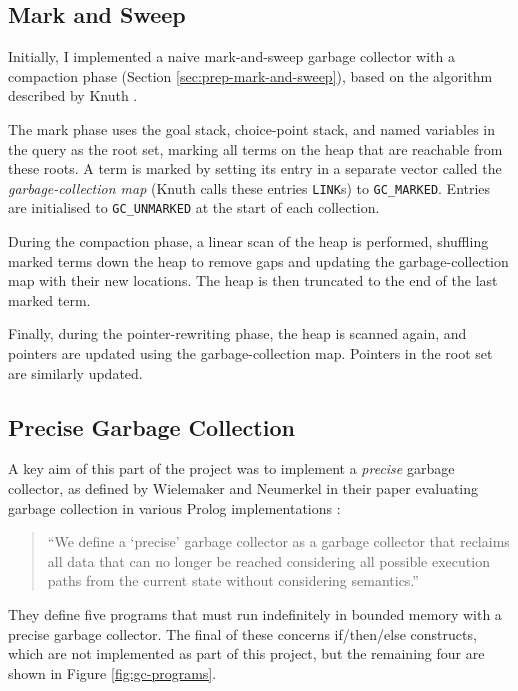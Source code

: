 \subsection{Mark and Sweep}

\label{sec:mark-and-sweep}

Initially, I implemented a naive mark-and-sweep garbage collector with a compaction phase (Section \ref{sec:prep-mark-and-sweep}), based on the algorithm described by Knuth \cite{knuthArtComputerProgramming1997}.

The mark phase uses the goal stack, choice-point stack, and named variables in the query as the root set, marking all terms on the heap that are reachable from these roots. A term is marked by setting its entry in a separate vector called the \emph{garbage-collection map} (Knuth calls these entries \texttt{LINK}s) to \texttt{GC\_MARKED}. Entries are initialised to \texttt{GC\_UNMARKED} at the start of each collection.

During the compaction phase, a linear scan of the heap is performed, shuffling marked terms down the heap to remove gaps and updating the garbage-collection map with their new locations. The heap is then truncated to the end of the last marked term.

Finally, during the pointer-rewriting phase, the heap is scanned again, and pointers are updated using the garbage-collection map. Pointers in the root set are similarly updated.

\subsection{Precise Garbage Collection}

\label{sec:precise-gc}

A key aim of this part of the project was to implement a \emph{precise} garbage collector, as defined by Wielemaker and Neumerkel in their paper evaluating garbage collection in various Prolog implementations \cite{wielemakerPreciseGarbageCollection2008}:

\begin{quote}
``We define a `precise' garbage collector as a garbage collector that reclaims all data that can no longer be reached considering all possible execution paths from the current state without considering semantics.''
\end{quote}

They define five programs that must run indefinitely in bounded memory with a precise garbage collector. The final of these concerns if/then/else constructs, which are not implemented as part of this project, but the remaining four are shown in Figure \ref{fig:gc-programs}.

